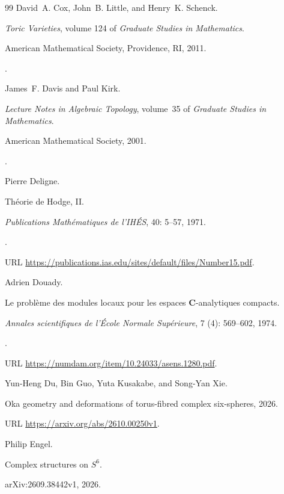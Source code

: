 \documentclass[11pt,a4paper]{article}
\numberwithin{equation}{section}
\theoremstyle{definition}
\begin{document}
\begin{thebibliography}{99}
David~A. Cox, John~B. Little, and Henry~K. Schenck.

\newblock \emph{Toric Varieties}, volume 124 of \emph{Graduate Studies in
  Mathematics}.

\newblock American Mathematical Society, Providence, RI, 2011.

\newblock {}.

James~F. Davis and Paul Kirk.

\newblock \emph{Lecture Notes in Algebraic Topology}, volume~35 of
  \emph{Graduate Studies in Mathematics}.

\newblock American Mathematical Society, 2001.

\newblock {}.

Pierre Deligne.

\newblock Th{\'e}orie de Hodge, {II}.

\newblock \emph{Publications Math{\'e}matiques de l'IH{\'E}S}, 40:
  5--57, 1971.

\newblock {}.

\newblock URL
  \url{https://publications.ias.edu/sites/default/files/Number15.pdf}.

Adrien Douady.

\newblock Le probl\`eme des modules locaux pour les espaces $\mathbf{C}$-analytiques
  compacts.

\newblock \emph{Annales scientifiques de l'\'Ecole Normale Sup\'erieure},
  7 (4): 569--602, 1974.

\newblock {}.

\newblock URL \url{https://numdam.org/item/10.24033/asens.1280.pdf}.

Yun-Heng Du, Bin Guo, Yuta Kusakabe, and Song-Yan Xie.

\newblock Oka geometry and deformations of torus-fibred complex six-spheres,
  2026.

\newblock URL \url{https://arxiv.org/abs/2610.00250v1}.

Philip Engel.

\newblock Complex structures on $S^6$.

\newblock arXiv:2609.38442v1, 2026.


\end{thebibliography}
\end{document}
